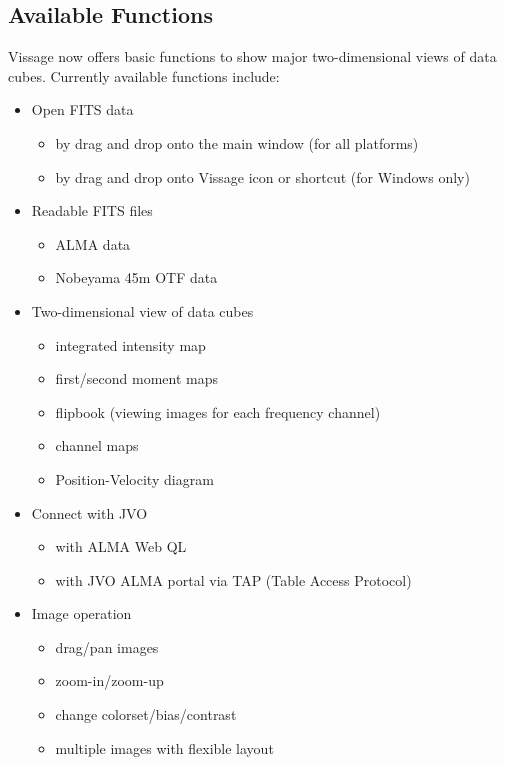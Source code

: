 \subsection{Available Functions}
Vissage now offers basic functions to show major two-dimensional views of data cubes. Currently available functions include:
\begin{itemize}
  \item Open FITS data
    \begin{itemize}
      \item by drag and drop onto the main window (for all platforms)
      \item by drag and drop onto Vissage icon or shortcut (for Windows only)
    \end{itemize}
  \item Readable FITS files
    \begin{itemize}
      \item ALMA data
      \item Nobeyama 45m OTF data
    \end{itemize}
  \item Two-dimensional view of data cubes
    \begin{itemize}
      \item integrated intensity map
      \item first/second moment maps
      \item flipbook (viewing images for each frequency channel)
      \item channel maps
      \item Position-Velocity diagram
    \end{itemize}
  \item Connect with JVO
    \begin{itemize}
      \item with ALMA Web QL
      \item with JVO ALMA portal via TAP (Table Access Protocol)
    \end{itemize}
  \item Image operation
    \begin{itemize}
      \item drag/pan images
      \item zoom-in/zoom-up
      \item change colorset/bias/contrast
      \item multiple images with flexible layout
    \end{itemize}
\end{itemize}

